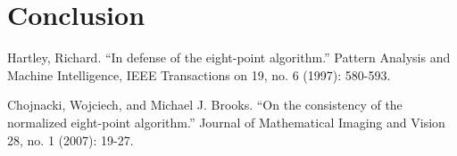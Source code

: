 \documentclass{article}
\begin{document}
\section{Conclusion}



\begin{thebibliography}{99}
	Hartley, Richard. ``In defense of the eight-point algorithm.'' Pattern Analysis and Machine Intelligence, IEEE Transactions on 19, no. 6 (1997): 580-593.

	Chojnacki, Wojciech, and Michael J. Brooks. ``On the consistency of the normalized eight-point algorithm.'' Journal of Mathematical Imaging and Vision 28, no. 1 (2007): 19-27.
\end{thebibliography}
\end{document}
